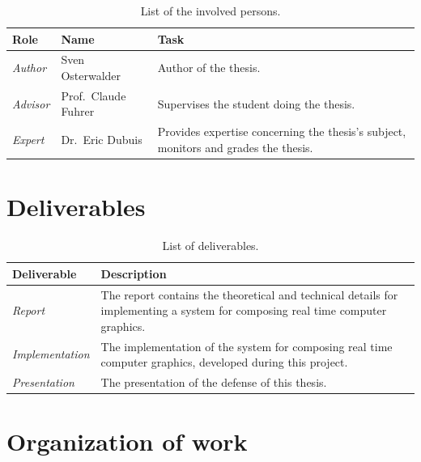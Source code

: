 \documentclass[%
    a4paper,    %
    justified,  %
    nobib,      %
    openany     %
]{tufte-book}
\makeatletter
\renewcommand{\label}[1]{\@tufte@label{##1}}%
\makeatother
\begin{document}
\begin{table}[h]
  \caption{List of the involved persons.}
  \begin{tabularx}{\textwidth}{llX}
    \toprule
    \textbf{Role} & \textbf{Name} & \textbf{Task} \\
    \midrule
    \textit{Author}  & Sven Osterwalder\protect\footnotemark[1]{} & Author of the thesis.\\
    \textit{Advisor} & Prof.\ Claude Fuhrer\protect\footnotemark[2]{} & Supervises the student doing the thesis.\\
    \textit{Expert}  & Dr.\ Eric Dubuis\protect\footnotemark[3]{}     & Provides expertise concerning the thesis's subject, monitors and grades the thesis.\\
    \bottomrule
  \end{tabularx}
\end{table}

\newpage{}

\section{Deliverables}
\label{sec:deliverables}

\begin{table}[h]
  \caption{List of deliverables.}
  \begin{tabularx}{\textwidth}{lX}
    \toprule
    \textbf{Deliverable}    & \textbf{Description}                            \\
    \midrule
    \textit{Report}         & The report contains the theoretical and technical details for
    implementing a system for composing real time computer graphics.          \\
    \midrule
    \textit{Implementation} & The implementation of the system for composing real time
    computer graphics, developed during this project.                         \\
    \midrule
    \textit{Presentation}   & The presentation of the defense of this thesis. \\
    \bottomrule
  \end{tabularx}
\end{table}

\section{Organization of work}
\label{sec:organization-of-work}
\end{document}
